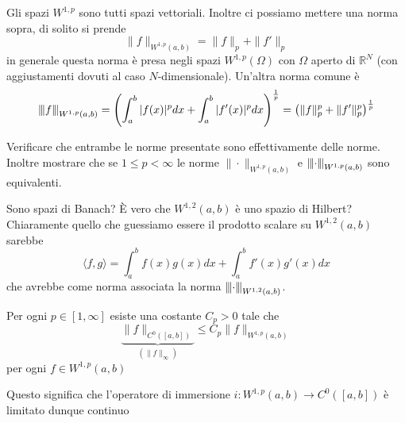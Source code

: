 Gli spazi \(W^{1,p}\) sono tutti spazi vettoriali. Inoltre ci possiamo
mettere una norma sopra, di solito si prende
\[
    \|f\|_{W^{1,p}{(a,b)}}  = \|f\|_p + \|f'\|_p
\]
in generale questa norma è presa negli spazi \(W^{1,p}{(\Omega)}\) con \(\Omega\)
aperto di \(\mathbb{R}^{N}\) (con aggiustamenti dovuti al caso
\(N\)-dimensionale). Un'altra norma comune è
\hypertarget{3norm}{\[
    \left\lvert\hspace{-1 pt}\left\lvert\hspace{-1 pt}\left\lvert f\right\lvert\hspace{-1 pt}\right\lvert\hspace{-1 pt}\right\lvert_{W^{1,p}{(a,b)}} = {\left( \int_a^{b}|f{(x)}|^{p}dx +
    \int_a^{b}|f'{(x)}|^{p}dx \right)}^{\frac{1}{p}} = {\left( \|f\|_p^{p} +
\|f'\|_p^{p} \right)}^{\frac{1}{p}}
\]}
\begin{eser}
    Verificare che entrambe le norme presentate sono effettivamente delle norme.
    Inoltre mostrare che se \(1 \le p < \infty\) le norme \(\|\cdot
    \|_{W^{1,p}{(a,b)}} \) e \(\left\lvert\hspace{-1 pt}\left\lvert\hspace{-1 pt}\left\lvert\cdot \right\lvert\hspace{-1 pt}\right\lvert\hspace{-1 pt}\right\lvert_{W^{1,p}{(a,b)}}\) sono
    equivalenti.
\end{eser}
Sono spazi di Banach? È vero che \(W^{1,2}{(a,b)}\) è uno spazio di Hilbert?
Chiaramente quello che guessiamo essere il prodotto scalare su \(W^{1,2}{(a,b)}\)
sarebbe
\begin{equation}\label{eq:prod_scalare_W}
    \langle f, g \rangle = \int_a^{b} f{(x)}g{(x)}dx + \int_a^{b} f'{(x)}g'{(x)}dx
\end{equation}
che avrebbe come norma associata la norma \(\left\lvert\hspace{-1 pt}\left\lvert\hspace{-1 pt}\left\lvert\cdot\right\lvert\hspace{-1 pt}\right\lvert\hspace{-1 pt}\right\lvert_{W^{1,2}{(a,b)}}\).
\begin{proposition}\label{prop:immersione_continua}
    Per ogni \(p \in [1,\infty]\) esiste una costante \(C_p > 0\) tale che
    \[\underbrace{\|f\|_{C^{0}{([a,b])}}}_{{\left( \|f\|_{\infty}  \right)} }  \le C_p \|f\|_{W^{1, p}{(a,b)}} \] per ogni \(f \in
W^{1,p}{(a,b)}\) 
\end{proposition}
\begin{note}
    Questo significa che l'operatore di immersione \(i : W^{1,p}{(a,b)} \to
    C^{0}{([a,b])}\) è limitato dunque continuo
\end{note}
